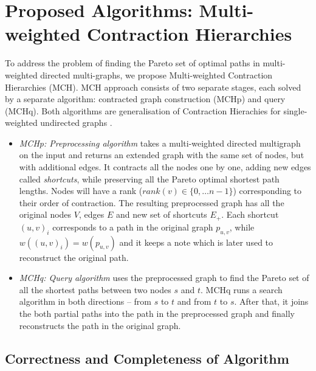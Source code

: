 
\section{Proposed Algorithms: Multi-weighted Contraction Hierarchies}
\label{secAlgorithms}

To address the problem of finding the Pareto set of optimal paths in multi-weighted directed multi-graphs, we propose Multi-weighted Contraction Hierarchies (MCH). 
MCH approach consists of two separate stages, each solved by a separate algorithm: contracted graph construction (MCHp) and query (MCHq). 
Both algorithms are generalisation of Contraction Hierachies for single-weighted undirected graphs \cite{geisberger2008contraction}.

\begin{itemize}
  \item {\em MCHp: Preprocessing algorithm} takes a multi-weighted directed multigraph on the input and returns an extended graph with the same set of nodes, but with additional edges. It contracts all the nodes one by one, adding new edges called \emph{shortcuts}, while preserving all the Pareto optimal shortest path lengths. 
Nodes will have a rank ($rank(v) \in \{0, \dots n-1\}$) corresponding to their order of contraction.
The resulting preprocessed graph has all the original nodes $V$, edges $E$ and new set of shortcuts $E_+$.
Each shortcut $(u,v)_i$ corresponds to a path in the original graph $p_{u,v}$, while $w((u,v)_i) = w(p_{u,v})$ and it keeps a note which is later used to reconstruct the original path.
  \item {\em MCHq: Query algorithm} uses the preprocessed graph to find the Pareto set of all
the shortest paths between two nodes $s$ and $t$. MCHq runs a search algorithm in both directions -- from $s$ to $t$ and from $t$ to $s$. After that, it joins the both partial paths into the path in the preprocessed graph and finally reconstructs the path in the original graph. 
\end{itemize}





\subsection{Correctness and Completeness of Algorithm}
\label{secFormalResults}

